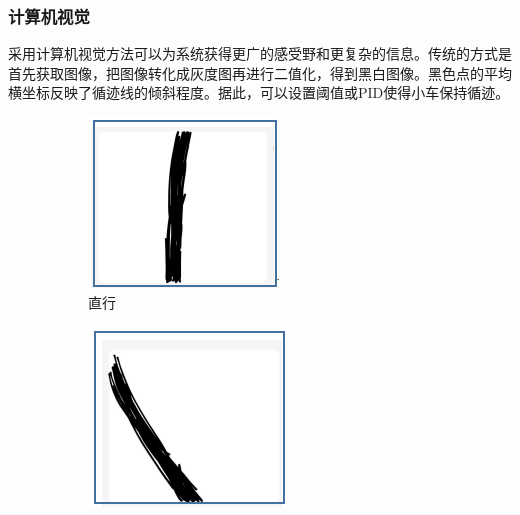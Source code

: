 \documentclass{report}
\begin{document}
\subsubsection{计算机视觉\cite{opencv}}
\label{subsec:label}
采用计算机视觉方法可以为系统获得更广的感受野和更复杂的信息。传统的方式是首先获取图像，把图像转化成灰度图再进行二值化，得到黑白图像。黑色点的平均横坐标反映了循迹线的倾斜程度。据此，可以设置阈值或PID使得小车保持循迹。
\begin{figure}[ht]
  \centering
   \begin{subfigure}[b]{0.3\textwidth}
     \centering
     \includegraphics[width=\textwidth]{figures/straight.png}
     \caption{直行}
     \label{fig:label}
   \end{subfigure}
   \hfill
 \begin{subfigure}[b]{0.3\textwidth}
   \centering
   \includegraphics[width=\textwidth]{figures/left.png}

\end{subfigure}
\end{figure}
\end{document}
